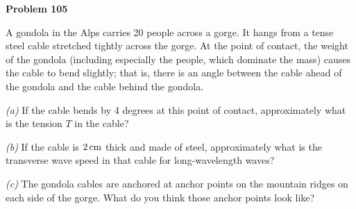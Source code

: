 \documentclass[12pt]{article}
\begin{document}
\begin{pottproblem}
\textbf{Problem 105}

A gondola in the Alps carries 20 people across a gorge.
It hangs from a tense steel cable stretched tightly across the gorge.
At the point of contact, the weight of the gondola (including especially
the people, which dominate the mass) causes the cable to bend slightly;
that is, there is an angle between the cable ahead of the gondola and the
cable behind the gondola.

\textsl{(a)}
If the cable bends by 4 degrees at this point of contact,
approximately what is the tension $T$ in the cable?

\textsl{(b)}
If the cable is $2\,\mathrm{cm}$ thick and made of steel, approximately what is the
transverse wave speed in that cable for long-wavelength waves?

\textsl{(c)}
The gondola cables are anchored at anchor points on the mountain ridges on each
side of the gorge. What do you think those anchor points look like?

\end{pottproblem}
\end{document}
